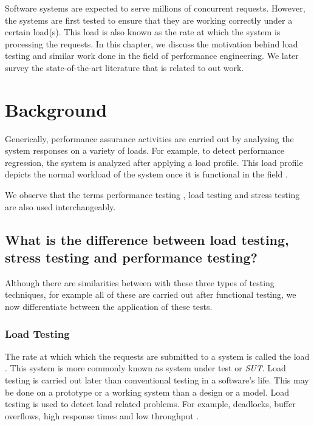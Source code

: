

Software systems are expected to serve millions of concurrent requests. However, the systems are first tested to ensure that they are working correctly under a certain load(s). This load is also known as the rate at which the system is processing the requests. 
In this chapter, we discuss the motivation behind load testing and similar work done in the field of performance engineering. We later survey the state-of-the-art literature that is related to out work.

\section{Background}

Generically, performance assurance activities are carried out by analyzing the system responses on a variety of loads. For example, to detect performance regression, the system is analyzed after applying a load profile. This load profile depicts the normal workload of the system once it is functional in the field \cite{464549}.

We observe that the terms performance testing \cite{Dillenseger2009,Menasce02loadtesting,Menasce:2002}, load testing \cite{536461,Bayan:2008,perf_load_stress,perf_web} and stress testing \cite{Bayan:2008,Yang:1996,4020172} are also used interchangeably. 

\subsection{What is the difference between load testing, stress testing and performance testing?}

Although there are similarities between with these three types of testing techniques, for example all of these are carried out after functional testing, we now differentiate between the application of these tests.

\subsubsection{Load Testing}

The rate at which which the requests are submitted to a system is called the load \cite{Beizer:1984}. This system is more commonly known as system under test or \textit{SUT}. Load testing is carried out later than conventional testing in a software's life. This may be done on a prototype or a working system than a design or a model. Load testing is used to detect load related problems. For example, deadlocks, buffer overflows, high response times and low throughput \cite{464549,Barna:2011,6032540}. 

